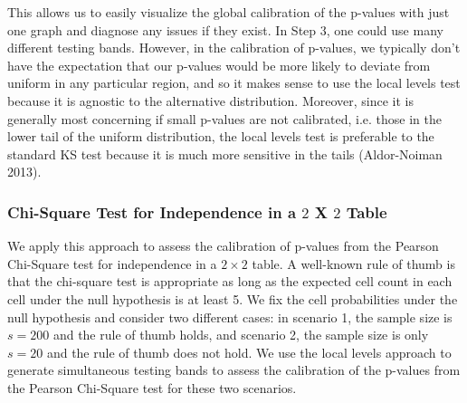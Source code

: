 \documentclass[article]{jss}
\begin{document}
\newline
\newline
This allows us to easily visualize the global calibration of the p-values with just one graph and diagnose any issues if they exist. In Step 3, one could use many different testing bands. However, in the calibration of p-values, we typically don't have the expectation that our p-values would be more likely to deviate from uniform in any particular region, and so it makes sense to use the local levels test because it is agnostic to the alternative distribution. Moreover, since it is generally most concerning if small p-values are not calibrated, i.e. those in the lower tail of the uniform distribution, the local levels test is preferable to the standard KS test because it is much more sensitive in the tails (Aldor-Noiman 2013).

\subsubsection{Chi-Square Test for Independence in a $2$ X $2$ Table}
We apply this approach to assess the calibration of p-values from the Pearson Chi-Square test for independence in a $2 \times 2$ table.  A well-known rule of thumb is that the chi-square test is appropriate as long as the expected cell count in each cell under the null hypothesis is at least 5.  We fix the cell probabilities under the null hypothesis and consider two different cases: in scenario 1, the sample size is $s=200$ and the rule of thumb holds, and scenario 2, the sample size is only $s=20$ and the rule of thumb does not hold.  We use the local levels approach to generate simultaneous testing bands to assess the calibration of the p-values from the Pearson Chi-Square test for these two scenarios.\\
\end{document}
